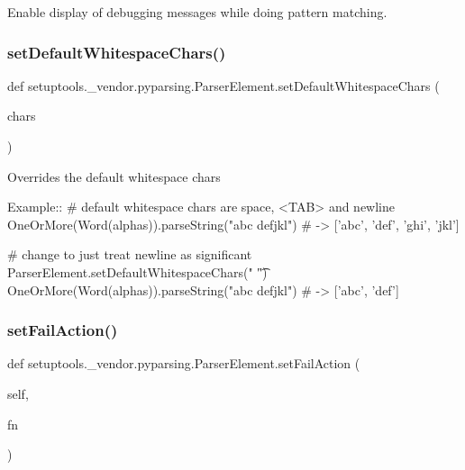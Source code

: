 \begin{DoxyVerb}Enable display of debugging messages while doing pattern matching.
\end{DoxyVerb}
 \mbox{\label{classsetuptools_1_1__vendor_1_1pyparsing_1_1ParserElement_ace898842e0db5a5e509c8842426aab45}} 
\subsubsection{\texorpdfstring{set\+Default\+Whitespace\+Chars()}{setDefaultWhitespaceChars()}}
{\footnotesize\ttfamily def setuptools.\+\_\+vendor.\+pyparsing.\+Parser\+Element.\+set\+Default\+Whitespace\+Chars (\begin{DoxyParamCaption}\item[{}]{chars }\end{DoxyParamCaption})\hspace{0.3cm}{\ttfamily [static]}}

\begin{DoxyVerb}Overrides the default whitespace chars

Example::
    # default whitespace chars are space, <TAB> and newline
    OneOrMore(Word(alphas)).parseString("abc def\nghi jkl")  # -> ['abc', 'def', 'ghi', 'jkl']
    
    # change to just treat newline as significant
    ParserElement.setDefaultWhitespaceChars(" \t")
    OneOrMore(Word(alphas)).parseString("abc def\nghi jkl")  # -> ['abc', 'def']
\end{DoxyVerb}
 \mbox{\label{classsetuptools_1_1__vendor_1_1pyparsing_1_1ParserElement_a44066b87aa19c3aaa008d0a7bda1cc6d}} 
\subsubsection{\texorpdfstring{set\+Fail\+Action()}{setFailAction()}}
{\footnotesize\ttfamily def setuptools.\+\_\+vendor.\+pyparsing.\+Parser\+Element.\+set\+Fail\+Action (\begin{DoxyParamCaption}\item[{}]{self,  }\item[{}]{fn }\end{DoxyParamCaption})}

